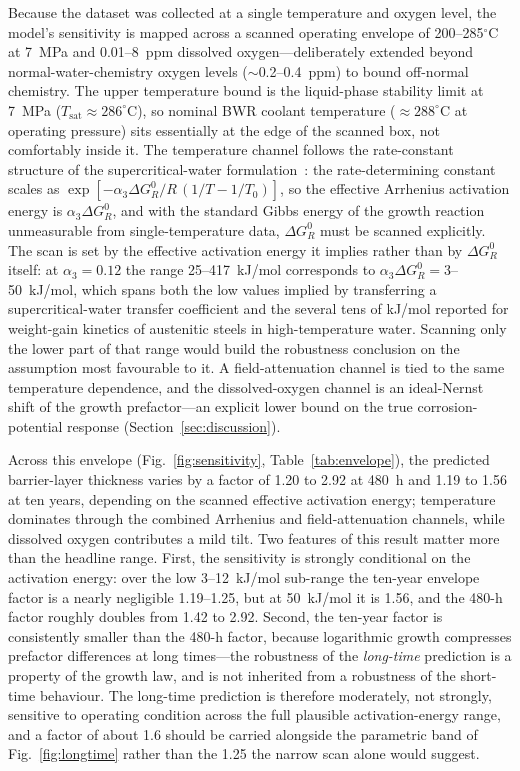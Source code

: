 \documentclass[preprint,12pt]{elsarticle}
\begin{document}
Because the dataset was collected at a single temperature and oxygen
level, the model's sensitivity is mapped across a scanned operating
envelope of 200--285$^\circ$C at 7~MPa and 0.01--8~ppm dissolved
oxygen---deliberately extended beyond normal-water-chemistry oxygen
levels ($\sim$0.2--0.4~ppm) to bound off-normal chemistry. The upper
temperature bound is the liquid-phase stability limit at 7~MPa
($T_\text{sat} \approx 286^\circ$C), so nominal BWR coolant temperature
($\approx 288^\circ$C at operating pressure) sits essentially at the
edge of the scanned box, not comfortably inside it. The temperature
channel follows the rate-constant structure of the supercritical-water
formulation~\citep{li2020scwpdm}: the rate-determining constant scales
as $\exp[-\alpha_3 \Delta G^0_R/R\,(1/T - 1/T_0)]$, so the effective
Arrhenius activation energy is $\alpha_3 \Delta G^0_R$, and with the
standard Gibbs energy of the growth reaction unmeasurable from
single-temperature data, $\Delta G^0_R$ must be scanned explicitly. The
scan is set by the effective activation energy it implies rather than by
$\Delta G^0_R$ itself: at $\alpha_3 = 0.12$ the range
25--417~kJ/mol corresponds to $\alpha_3 \Delta G^0_R = 3$--50~kJ/mol,
which spans both the low values implied by transferring a
supercritical-water transfer coefficient and the several tens of kJ/mol
reported for weight-gain kinetics of austenitic steels in
high-temperature water. Scanning only the lower part of that range would
build the robustness conclusion on the assumption most favourable to it.
A field-attenuation channel is tied to the same
temperature dependence, and the dissolved-oxygen channel is an
ideal-Nernst shift of the growth prefactor---an explicit lower bound on
the true corrosion-potential response (Section~\ref{sec:discussion}).

Across this envelope (Fig.~\ref{fig:sensitivity},
Table~\ref{tab:envelope}), the predicted barrier-layer thickness varies
by a factor of 1.20 to 2.92 at 480~h and 1.19 to 1.56 at ten years,
depending on the scanned effective activation energy; temperature
dominates through the combined Arrhenius and field-attenuation channels,
while dissolved oxygen contributes a mild tilt. Two features of this
result matter more than the headline range. First, the sensitivity is
strongly conditional on the activation energy: over the low
3--12~kJ/mol sub-range the ten-year envelope factor is a nearly
negligible 1.19--1.25, but at 50~kJ/mol it is 1.56, and the 480-h factor
roughly doubles from 1.42 to 2.92. Second, the ten-year factor is
consistently smaller than the 480-h factor, because logarithmic growth
compresses prefactor differences at long times---the robustness of the
\emph{long-time} prediction is a property of the growth law, and is not
inherited from a robustness of the short-time behaviour. The long-time
prediction is therefore moderately, not strongly, sensitive to operating
condition across the full plausible activation-energy range, and a factor
of about 1.6 should be carried alongside the parametric band of
Fig.~\ref{fig:longtime} rather than the 1.25 the narrow scan alone would
suggest.
\end{document}

